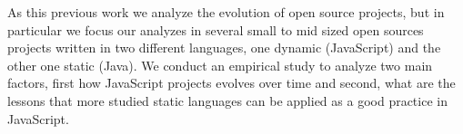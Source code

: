 As this previous work we analyze the evolution of open source projects, but in particular we focus our analyzes in several small to mid sized  open sources projects written in two different languages, one dynamic (JavaScript) and the other one static (Java). We conduct an empirical study to analyze two main factors, first how JavaScript projects evolves over time and second, what are the lessons that more studied static languages can be applied as a good practice in JavaScript.

